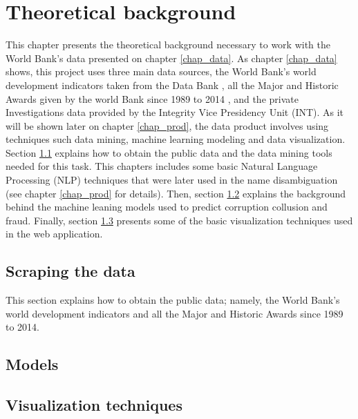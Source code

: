 \chapter{Theoretical background}\label{chap_teo}


This chapter presents the theoretical background necessary to work with the World Bank's data presented on chapter \ref{chap_data}. As chapter \ref{chap_data} shows, this project uses three main data sources, the World Bank's world development indicators taken from the Data Bank \parencite{wb_data}, all the Major and Historic Awards given by the world Bank since 1989 to 2014 \parencite{wb_data}, and the private Investigations data provided by the Integrity Vice Presidency Unit (INT). As it will be shown later on chapter \ref{chap_prod}, the data product involves using techniques such data mining, machine learning modeling and data visualization. 
Section  \ref{sec_scrape} explains how to obtain the public data and the data mining tools needed for this task. This chapters includes some basic Natural Language Processing (NLP) techniques that were later used in the name disambiguation (see chapter \ref{chap_prod} for details). Then, section \ref{sec_model_teo} explains the background behind the machine leaning models used to predict corruption collusion and fraud. Finally, section \ref{sec_vis_teo} presents some of the basic visualization techniques used in the web application.

\section{Scraping the data} \label{sec_scrape}

This section explains how to obtain the public data; namely, the World Bank's world development indicators and all the Major and Historic Awards since 1989 to 2014.



\section{Models} \label{sec_model_teo}

\section{Visualization techniques} \label{sec_vis_teo}